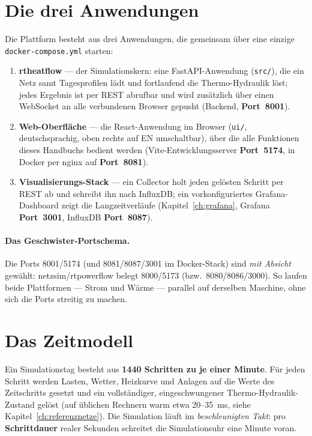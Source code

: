 \documentclass[11pt,a4paper,parskip=half]{scrreprt}
\newcommand{\ui}[1]{\textsf{\bfseries #1}}
\newcommand{\api}[1]{\texttt{#1}}
\begin{document}
\section{Die drei Anwendungen}

Die Plattform besteht aus drei Anwendungen, die gemeinsam über eine einzige
\texttt{docker-compose.yml} starten:

\begin{enumerate}
  \item \textbf{rtheatflow} --- der Simulationskern: eine FastAPI-Anwendung
    (\api{src/}), die ein Netz samt Tagesprofilen lädt und fortlaufend die
    Thermo-Hydraulik löst; jedes Ergebnis ist per REST abrufbar und wird
    zusätzlich über einen WebSocket an alle verbundenen Browser gepusht
    (Backend, \textbf{Port~8001}).
  \item \textbf{Web-Oberfläche} --- die React-Anwendung im Browser
    (\api{ui/}, deutschsprachig, oben rechts auf EN umschaltbar), über die alle
    Funktionen dieses Handbuchs bedient werden (Vite-Entwicklungsserver
    \textbf{Port~5174}, in Docker per nginx auf \textbf{Port~8081}).
  \item \textbf{Visualisierungs-Stack} --- ein Collector holt jeden gelösten
    Schritt per REST ab und schreibt ihn nach InfluxDB; ein vorkonfiguriertes
    Grafana-Dashboard zeigt die Langzeitverläufe (Kapitel~\ref{ch:grafana},
    Grafana \textbf{Port~3001}, InfluxDB \textbf{Port~8087}).
\end{enumerate}

\paragraph{Das Geschwister-Portschema.} Die Ports 8001/5174 (und 8081/8087/3001
im Docker-Stack) sind \emph{mit Absicht} gewählt: netzsim/rtpowerflow belegt
8000/5173 (bzw.\ 8080/8086/3000). So laufen beide Plattformen --- Strom und
Wärme --- parallel auf derselben Maschine, ohne sich die Ports streitig zu
machen.

\section{Das Zeitmodell}
\label{sec:zeitmodell}

Ein Simulationstag besteht aus \textbf{1440 Schritten zu je einer Minute}. Für
jeden Schritt werden Lasten, Wetter, Heizkurve und Anlagen auf die Werte des
Zeitschritts gesetzt und ein vollständiger, eingeschwungener
Thermo-Hydraulik-Zustand gelöst (auf üblichen Rechnern warm etwa 20--35~ms, siehe
Kapitel~\ref{ch:referenznetze}). Die Simulation läuft im \emph{beschleunigten
Takt}: pro \ui{Schrittdauer} realer Sekunden schreitet die Simulationsuhr eine
Minute voran.
\end{document}
